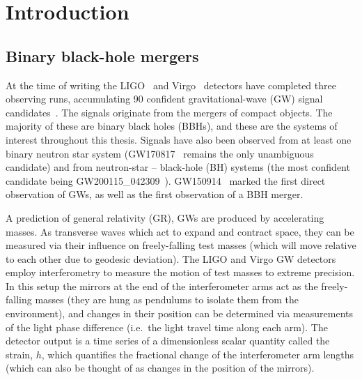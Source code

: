 
\chapter{Introduction}
\label{Chapter1}

\section{Binary black-hole mergers}
\label{ch1:sec:bbh_mergers}

At the time of writing the 
LIGO~\cite{LIGOScientific:2014pky} and Virgo~\cite{VIRGO:2014yos} detectors have completed three observing runs, accumulating 90 confident gravitational-wave (GW) signal candidates~\cite{LIGOScientific:2018mvr, LIGOScientific:2020ibl, LIGOScientific:2021usb, LIGOScientific:2021djp}.
The signals originate from the mergers of compact objects. 
The majority of these are binary black holes (BBHs), and these are the systems of interest throughout this thesis.  
Signals have also been observed from at least one binary neutron star system (GW170817~\cite{LIGOScientific:2017vwq} remains the only unambiguous candidate) and from neutron-star -- black-hole (BH) systems (the most confident candidate being GW200115\_042309~\cite{LIGOScientific:2021qlt}).
GW150914~\cite{LIGOScientific:2016aoc} marked the first direct observation of GWs, as well as the first observation of a BBH merger.

A prediction of general relativity (GR), GWs are produced by accelerating masses.
As transverse waves which act to expand and contract space, they can be measured via their influence on freely-falling test masses (which will move relative to each other due to geodesic deviation).
The LIGO and Virgo GW detectors employ interferometry to measure the motion of test masses to extreme precision. 
In this setup the mirrors at the end of the interferometer arms act as the freely-falling masses (they are hung as pendulums to isolate them from the environment), and changes in their position can be determined via measurements of the light phase difference (i.e.\ the light travel time along each arm).
The detector output is a time series of a dimensionless scalar quantity called the strain, $h$, which quantifies the fractional change of the interferometer arm lengths (which can also be thought of as changes in the position of the mirrors). 

